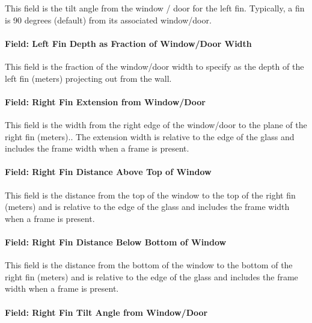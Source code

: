 This field is the tilt angle from the window / door for the left fin. Typically, a fin is 90 degrees (default) from its associated window/door.

\paragraph{Field: Left Fin Depth as Fraction of Window/Door Width}\label{field-left-fin-depth-as-fraction-of-windowdoor-width}

This field is the fraction of the window/door width to specify as the depth of the left fin (meters) projecting out from the wall.

\paragraph{Field: Right Fin Extension from Window/Door}\label{field-right-fin-extension-from-windowdoor-1}

This field is the width from the right edge of the window/door to the plane of the right fin (meters).. The extension width is relative to the edge of the glass and includes the frame width when a frame is present.

\paragraph{Field: Right Fin Distance Above Top of Window}\label{field-right-fin-distance-above-top-of-window-1}

This field is the distance from the top of the window to the top of the right fin (meters) and is relative to the edge of the glass and includes the frame width when a frame is present.

\paragraph{Field: Right Fin Distance Below Bottom of Window}\label{field-right-fin-distance-below-bottom-of-window-1}

This field is the distance from the bottom of the window to the bottom of the right fin (meters) and is relative to the edge of the glass and includes the frame width when a frame is present.

\paragraph{Field: Right Fin Tilt Angle from Window/Door}\label{field-right-fin-tilt-angle-from-windowdoor-1}


